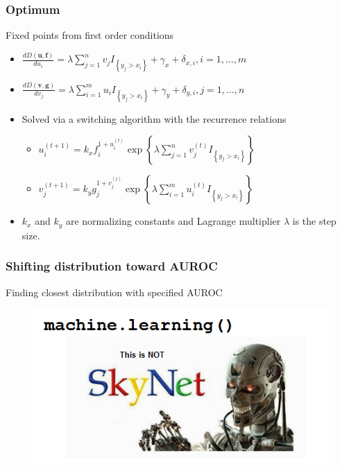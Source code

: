 \documentclass{beamer}
\begin{document}
\begin{frame}
\frametitle{Optimum}

Fixed points from first order conditions
\begin{itemize}
    \item $\frac{d D(\mathbf{u},\mathbf{f})}{d u_i} = \lambda \sum_{j = 1}^{n} v_j I_{\left\{ y_j > x_i \right\}} + \gamma_x + \delta_{x,i},
    i = 1, \dots, m$
    \item $\frac{d D(\mathbf{v},\mathbf{g})}{d v_j} = \lambda \sum_{i = 1}^{m} u_i I_{\left\{ y_j > x_i \right\}} + \gamma_y + \delta_{y,i},
    j = 1, \dots, n$
    \item Solved via a switching algorithm with the recurrence relations
    \begin{itemize}
        \item $u_i^{(t+1)} = k_x f_i ^{1 + u_i^{(t)}}
                \exp{ \left\{ \lambda \sum_{j = 1}^{n} v_j^{(t)} I_{\left\{ y_j > x_i \right\}} \right\} }$
        \item $v_j^{(t+1)} = k_y g_j ^{1 + v_j^{(t)}}
                \exp{ \left\{ \lambda \sum_{i = 1}^{m} u_i^{(t)} I_{\left\{ y_j > x_i \right\}}  \right\} }$
    \end{itemize}
    \item $k_x$ and $k_y$ are normalizing constants and Lagrange multiplier $\lambda$ is the step size.
\end{itemize}

\end{frame}


\begin{frame}
\frametitle{Shifting distribution toward AUROC}

Finding closest distribution with specified AUROC
\begin{figure}
    \includegraphics[scale =  0.75 ]{Figs/ThisIsNotSkyNetLogo.png}
\end{figure}

\end{frame}
\end{document}
